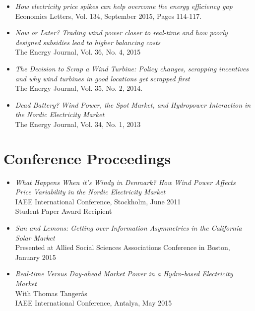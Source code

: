 \documentclass[margin]{res}
\begin{document}
\begin{resume}
\begin{itemize}
\item[] \emph{How electricity price spikes can help overcome the energy efficiency gap}\\
Economics Letters, Vol. 134, September 2015, Pages 114-117.

\item[] \emph{Now or Later? Trading wind power closer to real-time and how poorly designed subsidies lead to higher balancing costs}\\
The Energy Journal, Vol. 36, No. 4, 2015 

\item[] \emph{The Decision to Scrap a Wind Turbine: Policy changes, scrapping incentives and why wind turbines in good locations get scrapped first}\\
The Energy Journal, Vol. 35, No. 2, 2014.

\item[] \emph{Dead Battery? Wind Power, the Spot Market, and Hydropower Interaction in the Nordic Electricity Market}\\
The Energy Journal, Vol. 34, No. 1, 2013
\end{itemize}

\normalsize{\section{Conference Proceedings}}
\begin{itemize}  
\setlength{\itemsep}{10pt}
\item[] \emph{What Happens When it's Windy in Denmark? How Wind Power Affects Price Variability in the Nordic Electricity Market}\\ 
IAEE International Conference, Stockholm, June 2011  \\
Student Paper Award Recipient 

\item[] \emph {Sun and Lemons: Getting over Information Asymmetries in the California Solar Market} \\
Presented at Allied Social Sciences Associations Conference in Boston, January 2015 \\

\item[] \emph{Real-time Versus Day-ahead Market Power in a Hydro-based Electricity Market} \\ 
With Thomas Tanger\aa s \\
IAEE International Conference, Antalya, May 2015
\end{itemize}



\end{resume}
\end{document}
